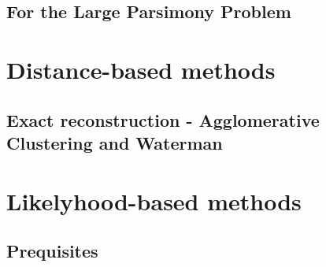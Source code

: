\subsection{For the Large Parsimony Problem}



\section{Distance-based methods}
\subsection{Exact reconstruction - Agglomerative Clustering and Waterman}

\newpage


\section{Likelyhood-based methods} 
\subsection{Prequisites}



